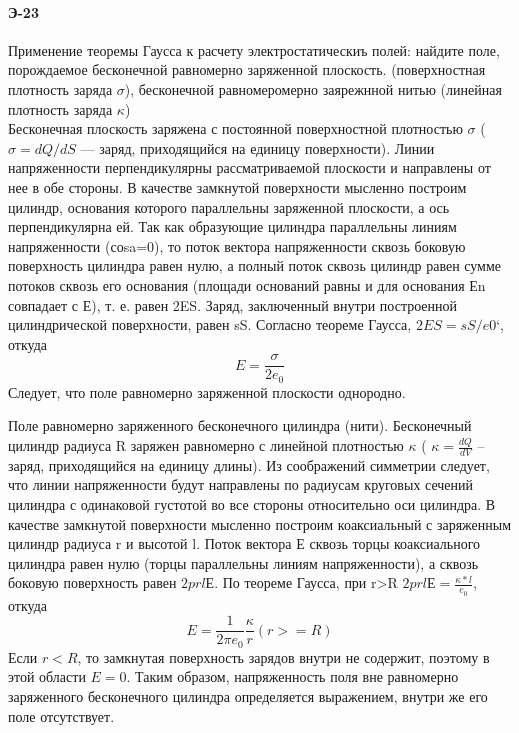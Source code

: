 \documentclass[__main__.tex]{subfiles}
\begin{document}
\paragraph{Э-23}
Применение теоремы Гаусса к расчету электростатическиъ полей: найдите поле, порождаемое бесконечной равномерно заряженной плоскость. (поверхностная плотность заряда $\sigma$), бесконечной равномеромерно заярежнной нитью (линейная плотность заряда $\kappa$)\\

Бесконечная плоскость заряжена с постоянной поверхностной плотностью $\sigma$ ($\sigma=dQ/dS$ — заряд, приходящийся на единицу поверхности). Линии напряженности перпендикулярны рассматриваемой плоскости и направлены от нее в обе стороны. В качестве замкнутой поверхности мысленно построим цилиндр, основания которого параллельны заряженной плоскости, а ось перпендикулярна ей. Так как образующие цилиндра параллельны линиям напряженности (соsa=0), то поток вектора напряженности сквозь боковую поверхность цилиндра равен нулю, а полный поток сквозь цилиндр равен сумме потоков сквозь его основания (площади оснований равны и для основания Еn совпадает с Е), т. е. равен 2ES. Заряд, заключенный внутри построенной цилиндрической поверхности, равен sS. Согласно теореме Гаусса,  $2ES=sS/e0$`, откуда 
$$E = \frac{\sigma}{2e_0}$$
Следует, что поле равномерно заряженной плоскости однородно.


Поле равномерно заряженного бесконечного цилиндра (нити). Бесконечный цилиндр радиуса R заряжен равномерно с линейной плотностью  $\kappa$ ( $\kappa=\frac{dQ}{dV}$   –  заряд, приходящийся на единицу длины). Из соображений симметрии следует, что линии напряженности будут направлены по радиусам круговых сечений цилиндра с одинаковой густотой во все стороны относительно оси цилиндра. В качестве замкнутой поверхности мысленно построим коаксиальный с заряженным цилиндр радиуса r и высотой l. Поток вектора Е сквозь торцы коаксиального цилиндра равен нулю  (торцы параллельны линиям напряженности), а сквозь боковую поверхность равен $2prlЕ$. По теореме Гаусса, при r>R $2prlЕ = \frac{\kappa*l}{e_0}$, откуда
$$E=\frac{1}{2\pi e_0}\frac{\kappa}{r} (r >= R)$$
Если $r<R$, то замкнутая поверхность зарядов внутри не содержит, поэтому в этой области $E=0$. Таким образом, напряженность поля вне равномерно заряженного бесконечного цилиндра определя­ется выражением, внутри же его поле отсутствует.
\end{document}
